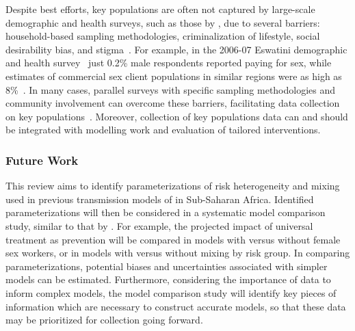 Despite best efforts, key populations are often not captured by
large-scale demographic and health surveys, such as those by \textcite{DHS},
due to several barriers:
household-based sampling methodologies,
criminalization of lifestyle,
social desirability bias,
and stigma~\cite{Abdul-Quader2014}.
For example, in the 2006-07 Eswatini demographic and health survey~\cite{DHS-SWZ}
just 0.2\% male respondents reported paying for sex, while estimates of
commercial sex client populations in similar regions were as high as 8\%~\cite{Carael2006}.
In many cases, parallel surveys with specific sampling methodologies and community involvement
can overcome these barriers, facilitating data collection on key populations~\cite{SwaziKP2014}.
Moreover, collection of key populations data can and should be integrated with
modelling work and evaluation of tailored interventions.
\subsubsection*{Future Work}
This review aims to identify parameterizations of risk heterogeneity and mixing
used in previous transmission models of \hiv in Sub-Saharan Africa.
Identified parameterizations will then be considered in a systematic model comparison study,
similar to that by \textcite{Hontelez2013}.
For example, the projected impact of universal treatment as prevention will be compared
in models with versus without female sex workers, or
in models with versus without mixing by risk group.
In comparing parameterizations, potential biases and uncertainties associated with
simpler models can be estimated.
Furthermore, considering the importance of data to inform complex models,
the model comparison study will identify key pieces of information
which are necessary to construct accurate models,
so that these data may be prioritized for collection going forward.
